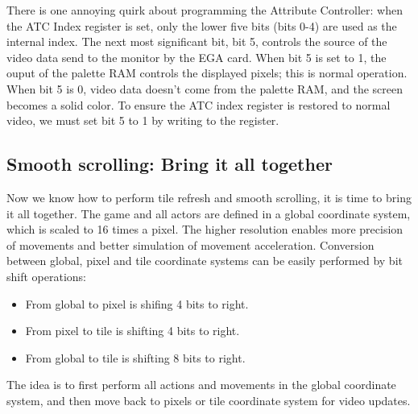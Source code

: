 \documentclass[book.tex]{subfiles}
\begin{document}
There is one annoying quirk about programming the Attribute Controller: when the ATC Index register is set, only the lower five bits (bits 0-4) are used as the internal index. The next most significant bit, bit 5, controls the source of the video data send to the monitor by the EGA card. When bit 5 is set to 1, the ouput of the palette RAM controls the displayed pixels; this is normal operation. When bit 5 is 0, video data doesn't come from the palette RAM, and the screen becomes a solid color. To ensure the ATC index register is restored to normal video, we must set bit 5 to 1 by writing  to the register.\\ 

\begin{minipage}{\textwidth}
  
  \end{minipage}
  \label{ega_pel_pan}
  \par

\subsection{Smooth scrolling: Bring it all together}
Now we know how to perform tile refresh and smooth scrolling, it is time to bring it all together. The game and all actors are defined in a global coordinate system, which is scaled to 16 times a pixel. The higher resolution enables more precision of movements and better simulation of movement acceleration. Conversion between global, pixel and tile coordinate systems can be easily performed by bit shift operations:
\begin{itemize}
\item From global to pixel is shifing 4 bits to right.
\item From pixel to tile is shifting 4 bits to right.
\item From global to tile is shifting 8 bits to right.
\end{itemize}

The idea is to first perform all actions and movements in the global coordinate system, and then move back to pixels or tile coordinate system for video updates. \\
\begin{minipage}{\textwidth}
  
  \end{minipage}
  \label{ega_refresh}
  \par
\end{document}

